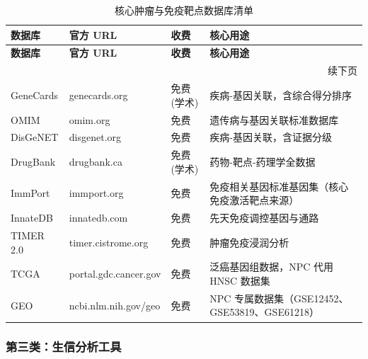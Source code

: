 \documentclass[12pt,a4paper,twoside]{article}
\begin{document}
\begin{longtable}{p{3cm}p{3.5cm}p{2cm}p{4.5cm}}
\caption{核心肿瘤与免疫靶点数据库清单} \label{tab:target_databases} \\
\toprule
\textbf{数据库} & \textbf{官方 URL} & \textbf{收费} & \textbf{核心用途} \\
\midrule
\endfirsthead
\toprule
\textbf{数据库} & \textbf{官方 URL} & \textbf{收费} & \textbf{核心用途} \\
\midrule
\endhead
\midrule
\multicolumn{4}{r}{\small 续下页} \\
\endfoot
\bottomrule
\endlastfoot
GeneCards & genecards.org & 免费(学术) & 疾病-基因关联，含综合得分排序 \\
\addlinespace
OMIM & omim.org & 免费 & 遗传病与基因关联标准数据库 \\
\addlinespace
DisGeNET & disgenet.org & 免费 & 疾病-基因关联，含证据分级 \\
\addlinespace
DrugBank & drugbank.ca & 免费(学术) & 药物-靶点-药理学全数据 \\
\addlinespace
ImmPort & immport.org & 免费 & 免疫相关基因标准基因集（核心免疫激活靶点来源）\\
\addlinespace
InnateDB & innatedb.com & 免费 & 先天免疫调控基因与通路 \\
\addlinespace
TIMER 2.0 & timer.cistrome.org & 免费 & 肿瘤免疫浸润分析 \\
\addlinespace
TCGA & portal.gdc.cancer.gov & 免费 & 泛癌基因组数据，NPC 代用 HNSC 数据集 \\
\addlinespace
GEO & ncbi.nlm.nih.gov/geo & 免费 & NPC 专属数据集（GSE12452、GSE53819、GSE61218）\\
\end{longtable}

\subsubsection{第三类：生信分析工具}
\end{document}
